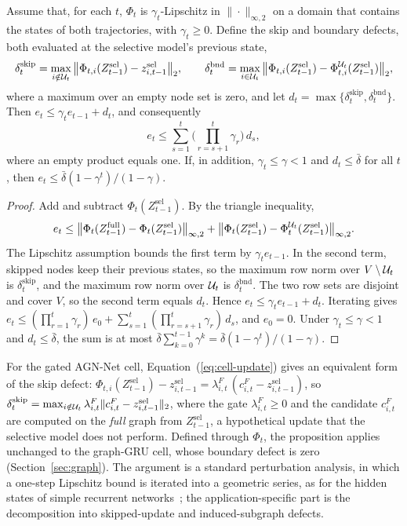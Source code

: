 \begin{Proposition}
\label{prop:bound}
Assume that, for each $t$, $\Phi_t$ is $\gamma_t$-Lipschitz in $\|\cdot\|_{\infty,2}$ on a domain that contains the states of both trajectories, with $\gamma_t\ge0$. Define the skip and boundary defects, both evaluated at the selective model's previous state,
\[
\delta^{\mathrm{skip}}_t=\max_{i\notin\mathcal{U}_t}\big\|\Phi_{t,i}(Z^{\mathrm{sel}}_{t-1})-z^{\mathrm{sel}}_{i,t-1}\big\|_2,\qquad
\delta^{\mathrm{bnd}}_t=\max_{i\in\mathcal{U}_t}\big\|\Phi_{t,i}(Z^{\mathrm{sel}}_{t-1})-\Phi^{\mathcal{U}_t}_{t,i}(Z^{\mathrm{sel}}_{t-1})\big\|_2,
\]
where a maximum over an empty node set is zero, and let $d_t=\max\{\delta^{\mathrm{skip}}_t,\delta^{\mathrm{bnd}}_t\}$. Then $e_t\le\gamma_t e_{t-1}+d_t$, and consequently
\[
e_t\le\sum_{s=1}^{t}\Big(\prod_{r=s+1}^{t}\gamma_r\Big)\,d_s ,
\]
where an empty product equals one. If, in addition, $\gamma_t\le\gamma<1$ and $d_t\le\bar\delta$ for all $t$, then $e_t\le\bar\delta(1-\gamma^t)/(1-\gamma)$.
\end{Proposition}
\begin{proof}
Add and subtract $\Phi_t(Z^{\mathrm{sel}}_{t-1})$. By the triangle inequality,
\[
e_t\le\big\|\Phi_t(Z^{\mathrm{full}}_{t-1})-\Phi_t(Z^{\mathrm{sel}}_{t-1})\big\|_{\infty,2}+\big\|\Phi_t(Z^{\mathrm{sel}}_{t-1})-\Phi_t^{\mathcal{U}_t}(Z^{\mathrm{sel}}_{t-1})\big\|_{\infty,2}.
\]
The Lipschitz assumption bounds the first term by $\gamma_t e_{t-1}$. In the second term, skipped nodes keep their previous states, so the maximum row norm over $V\setminus\mathcal{U}_t$ is $\delta^{\mathrm{skip}}_t$, and the maximum row norm over $\mathcal{U}_t$ is $\delta^{\mathrm{bnd}}_t$. The two row sets are disjoint and cover $V$, so the second term equals $d_t$. Hence $e_t\le\gamma_t e_{t-1}+d_t$. Iterating gives $e_t\le(\prod_{r=1}^{t}\gamma_r)\,e_0+\sum_{s=1}^{t}(\prod_{r=s+1}^{t}\gamma_r)\,d_s$, and $e_0=0$. Under $\gamma_t\le\gamma<1$ and $d_t\le\bar\delta$, the sum is at most $\bar\delta\sum_{k=0}^{t-1}\gamma^k=\bar\delta(1-\gamma^t)/(1-\gamma)$.
\end{proof}

For the gated AGN-Net cell, Equation~(\ref{eq:cell-update}) gives an equivalent form of the skip defect: $\Phi_{t,i}(Z^{\mathrm{sel}}_{t-1})-z^{\mathrm{sel}}_{i,t-1}=\lambda^{F}_{i,t}\,(c^{F}_{i,t}-z^{\mathrm{sel}}_{i,t-1})$, so $\delta^{\mathrm{skip}}_t=\max_{i\notin\mathcal{U}_t}\lambda^{F}_{i,t}\|c^{F}_{i,t}-z^{\mathrm{sel}}_{i,t-1}\|_2$, where the gate $\lambda^{F}_{i,t}\ge0$ and the candidate $c^{F}_{i,t}$ are computed on the \emph{full} graph from $Z^{\mathrm{sel}}_{t-1}$, a hypothetical update that the selective model does not perform. Defined through $\Phi_t$, the proposition applies unchanged to the graph-GRU cell, whose boundary defect is zero (Section~\ref{sec:graph}). The argument is a standard perturbation analysis, in which a one-step Lipschitz bound is iterated into a geometric series, as for the hidden states of simple recurrent networks~\cite{mitarchuk2024length}; the application-specific part is the decomposition into skipped-update and induced-subgraph defects.

